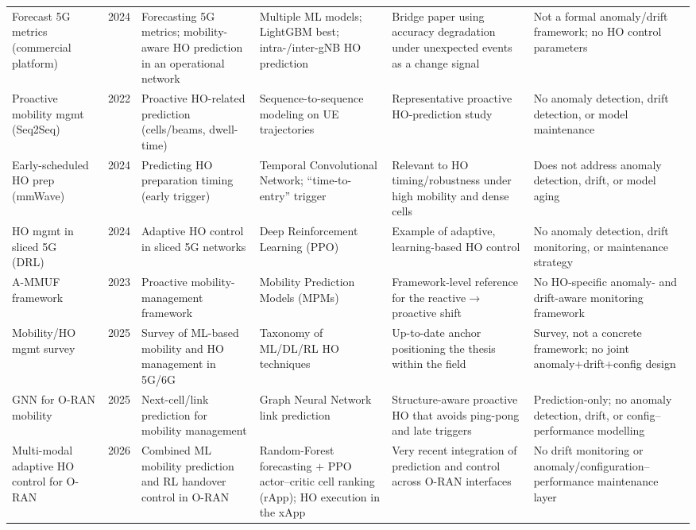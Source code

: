 \begin{table}[p]
\begin{tabular}{@{}p{2.1cm}cp{2.0cm}p{2.2cm}p{2.5cm}p{2.4cm}@{}}
Forecast 5G metrics (commercial platform)~\cite{forecast5g2024} & 2024 &
Forecasting 5G metrics; mobility-aware HO prediction in an operational network &
Multiple ML models; LightGBM best; intra-/inter-gNB HO prediction &
Bridge paper using accuracy degradation under unexpected events as a change signal &
Not a formal anomaly/drift framework; no HO control parameters \\

Proactive mobility mgmt (Seq2Seq)~\cite{seq2seqMob2022} & 2022 &
Proactive HO-related prediction (cells/beams, dwell-time) &
Sequence-to-sequence modeling on UE trajectories &
Representative proactive HO-prediction study &
No anomaly detection, drift detection, or model maintenance \\

Early-scheduled HO prep (mmWave)~\cite{eshop2024} & 2024 &
Predicting HO preparation timing (early trigger) &
Temporal Convolutional Network; ``time-to-entry'' trigger &
Relevant to HO timing/robustness under high mobility and dense cells &
Does not address anomaly detection, drift, or model aging \\

HO mgmt in sliced 5G (DRL)~\cite{slicedDRL2024} & 2024 &
Adaptive HO control in sliced 5G networks &
Deep Reinforcement Learning (PPO) &
Example of adaptive, learning-based HO control &
No anomaly detection, drift monitoring, or maintenance strategy \\

A-MMUF framework~\cite{ammuf2022} & 2023 &
Proactive mobility-management framework &
Mobility Prediction Models (MPMs) &
Framework-level reference for the reactive$\rightarrow$proactive shift &
No HO-specific anomaly- and drift-aware monitoring framework \\

Mobility/HO mgmt survey~\cite{hoMgmtSurvey2025} & 2025 &
Survey of ML-based mobility and HO management in 5G/6G &
Taxonomy of ML/DL/RL HO techniques &
Up-to-date anchor positioning the thesis within the field &
Survey, not a concrete framework; no joint anomaly+drift+config design \\

GNN for O-RAN mobility~\cite{gnnOranMob2025} & 2025 &
Next-cell/link prediction for mobility management &
Graph Neural Network link prediction &
Structure-aware proactive HO that avoids ping-pong and late triggers &
Prediction-only; no anomaly detection, drift, or config--performance modelling \\

Multi-modal adaptive HO control for O-RAN~\cite{multimodalHO2026} & 2026 &
Combined ML mobility prediction and RL handover control in O-RAN &
Random-Forest forecasting $+$ PPO actor--critic cell ranking (rApp); HO execution in the xApp &
Very recent integration of prediction and control across O-RAN interfaces &
No drift monitoring or anomaly/configuration--performance maintenance layer \\
\bottomrule
\end{tabular}
\end{table}

